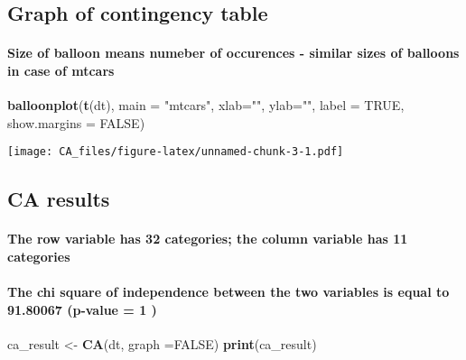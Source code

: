 \documentclass[]{article}
\newenvironment{Shaded}{\begin{snugshade}}{\end{snugshade}}
\newcommand{\KeywordTok}[1]{\textcolor[rgb]{0.13,0.29,0.53}{\textbf{#1}}}
\newcommand{\DataTypeTok}[1]{\textcolor[rgb]{0.13,0.29,0.53}{#1}}
\newcommand{\StringTok}[1]{\textcolor[rgb]{0.31,0.60,0.02}{#1}}
\newcommand{\OtherTok}[1]{\textcolor[rgb]{0.56,0.35,0.01}{#1}}
\newcommand{\NormalTok}[1]{#1}
\let\oldparagraph\paragraph
\renewcommand{\paragraph}[1]{\oldparagraph{#1}\mbox{}}
\begin{document}
\subsection{Graph of contingency
table}\label{graph-of-contingency-table}

\paragraph{Size of balloon means numeber of occurences - similar sizes
of balloons in case of
mtcars}\label{size-of-balloon-means-numeber-of-occurences---similar-sizes-of-balloons-in-case-of-mtcars}

\begin{Shaded}
\begin{Highlighting}[]
\KeywordTok{balloonplot}\NormalTok{(}\KeywordTok{t}\NormalTok{(dt), }\DataTypeTok{main =} \StringTok{"mtcars"}\NormalTok{, }\DataTypeTok{xlab=}\StringTok{""}\NormalTok{, }\DataTypeTok{ylab=}\StringTok{""}\NormalTok{, }
            \DataTypeTok{label =} \OtherTok{TRUE}\NormalTok{, }\DataTypeTok{show.margins =} \OtherTok{FALSE}\NormalTok{)}
\end{Highlighting}
\end{Shaded}

\texttt{[image: CA\_files/figure-latex/unnamed-chunk-3-1.pdf]}

\subsection{CA results}\label{ca-results}

\paragraph{The row variable has 32 categories; the column variable has
11
categories}\label{the-row-variable-has-32-categories-the-column-variable-has-11-categories}

\paragraph{The chi square of independence between the two variables is
equal to 91.80067 (p-value = 1
)}\label{the-chi-square-of-independence-between-the-two-variables-is-equal-to-91.80067-p-value-1}

\begin{Shaded}
\begin{Highlighting}[]
\NormalTok{ca_result <-}\StringTok{ }\KeywordTok{CA}\NormalTok{(dt, }\DataTypeTok{graph =}\OtherTok{FALSE}\NormalTok{)}
\KeywordTok{print}\NormalTok{(ca_result) }
\end{Highlighting}
\end{Shaded}
\end{document}
